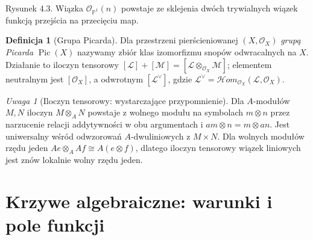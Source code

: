 \documentclass[11pt,a4paper,openany]{report}
\numberwithin{equation}{section}
\theoremstyle{plain}
\theoremstyle{definition}
\newtheorem{definicja}[twierdzenie]{Definicja}
\theoremstyle{remark}
\newtheorem{uwaga}[twierdzenie]{Uwaga}
\newcommand{\A}{\mathbb A}
\newcommand{\PP}{\mathbb P}
\begin{document}
\begin{center}

{\small Rysunek 4.3. Wiązka $\mathcal O_{\PP^1}(n)$ powstaje ze sklejenia dwóch trywialnych wiązek funkcją przejścia na przecięciu map.}\par
\end{center}

\begin{definicja}[Grupa Picarda]
Dla przestrzeni pierścieniowanej $(X,\mathcal O_X)$
\emph{grupą Picarda} $\operatorname{Pic}(X)$
nazywamy zbiór klas izomorfizmu snopów odwracalnych
na $X$. Działanie to iloczyn tensorowy
$[\mathcal L]+[\mathcal M]=[\mathcal L\otimes_{\mathcal O_X}\mathcal M]$;
elementem neutralnym jest $[\mathcal O_X]$, a odwrotnym
$[\mathcal L^\vee]$, gdzie
$\mathcal L^\vee=\mathcal{H}om_{\mathcal O_X}
(\mathcal L,\mathcal O_X)$.
\end{definicja}

\begin{uwaga}[Iloczyn tensorowy: wystarczające przypomnienie]
Dla $A$-modułów $M,N$ iloczyn $M\otimes_A N$ powstaje
z wolnego modułu na symbolach $m\otimes n$ przez
narzucenie relacji addytywności w obu argumentach
i $am\otimes n=m\otimes an$. Jest uniwersalny
wśród odwzorowań $A$-dwuliniowych z $M\times N$.
Dla wolnych modułów rzędu jeden
$Ae\otimes_A Af\cong A(e\otimes f)$, dlatego
iloczyn tensorowy wiązek liniowych jest znów
lokalnie wolny rzędu jeden.
\end{uwaga}

\section{Krzywe algebraiczne: warunki i pole funkcji}
\label{sec:curves-intro}
\end{document}

